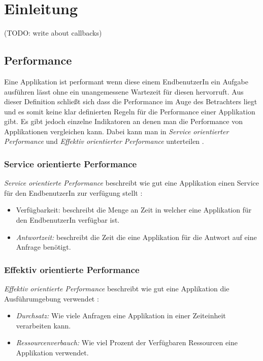 \section{Einleitung}
\label{section:Einleitung}


(TODO: write about callbacks)

\subsection{Performance}

Eine Applikation ist performant wenn diese einem EndbenutzerIn ein Aufgabe ausführen lässt ohne ein unangemessene Wartezeit für diesen hervorruft. Aus dieser Definition schließt sich dass die Performance im Auge des Betrachters liegt und es somit keine klar definierten Regeln für die Performance einer Applikation gibt. Es gibt jedoch einzelne Indikatoren an denen man die Performance von Applikationen vergleichen kann. Dabei kann man in \emph{Service orientierter Performance} und \emph{Effektiv orientierter Performance} unterteilen \cite[p. 2]{Mol2009}.

\subsubsection{Service orientierte Performance}

\emph{Service orientierte Performance} beschreibt wie gut eine Applikation einen Service für den EndbenutzerIn zur verfügung stellt \cite[p. 2]{Mol2009}:

\begin{itemize}
  \item {Verfügbarkeit:} beschreibt die Menge an Zeit in welcher eine Applikation für den EndbenutzerIn verfügbar ist.
  \item \emph{Antwortzeit:} beschreibt die Zeit die eine Applikation für die Antwort auf eine Anfrage benötigt. 
\end{itemize}    
    

\subsubsection{Effektiv orientierte Performance}

\emph{Effektiv orientierte Performance} beschreibt wie gut eine Applikation die Ausführumgebung verwendet \cite[p. 2]{Mol2009}:

\begin{itemize}
  \item \emph{Durchsatz:} Wie viele Anfragen eine Applikation in einer Zeiteinheit verarbeiten kann.
  \item \emph{Ressourcenverbauch:} Wie viel Prozent der Verfügbaren Ressourcen eine Applikation verwendet. 
\end{itemize}

